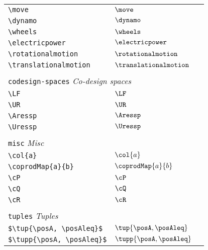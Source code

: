 \begin{longtable}{lll}
 {\color[rgb]{0.5,0.5,0.5}\texttt{\textbackslash move}} & $\move$ & \\ 
 {\color[rgb]{0.5,0.5,0.5}\texttt{\textbackslash dynamo}} & $\dynamo$ & \\ 
 {\color[rgb]{0.5,0.5,0.5}\texttt{\textbackslash wheels}} & $\wheels$ & \\ 
 {\color[rgb]{0.5,0.5,0.5}\texttt{\textbackslash electricpower}} & $\electricpower$ & \\ 
 {\color[rgb]{0.5,0.5,0.5}\texttt{\textbackslash rotationalmotion}} & $\rotationalmotion$ & \\ 
 {\color[rgb]{0.5,0.5,0.5}\texttt{\textbackslash translationalmotion}} & $\translationalmotion$ & \\ 
  &  & \\ 
 \multicolumn{3}{l}{{\color[rgb]{0.5,0.5,0.5}\texttt{codesign-spaces}} \emph{Co-design spaces}}\\ 
 \hline
\hline
{\color[rgb]{0.5,0.5,0.5}\texttt{\textbackslash LF}} & $\LF$ & \\ 
 {\color[rgb]{0.5,0.5,0.5}\texttt{\textbackslash UR}} & $\UR$ & \\ 
 {\color[rgb]{0.5,0.5,0.5}\texttt{\textbackslash Aressp}} & $\Aressp$ & \\ 
 {\color[rgb]{0.5,0.5,0.5}\texttt{\textbackslash Uressp}} & $\Uressp$ & \\ 
  &  & \\ 
 \multicolumn{3}{l}{{\color[rgb]{0.5,0.5,0.5}\texttt{misc}} \emph{Misc}}\\ 
 \hline
\hline
{\color[rgb]{0.5,0.5,0.5}\texttt{\textbackslash col\{a\}}} & $\col{a}$ & \\ 
 {\color[rgb]{0.5,0.5,0.5}\texttt{\textbackslash coprodMap\{a\}\{b\}}} & $\coprodMap{a}{b}$ & \\ 
 {\color[rgb]{0.5,0.5,0.5}\texttt{\textbackslash cP}} & $\cP$ & \\ 
 {\color[rgb]{0.5,0.5,0.5}\texttt{\textbackslash cQ}} & $\cQ$ & \\ 
 {\color[rgb]{0.5,0.5,0.5}\texttt{\textbackslash cR}} & $\cR$ & \\ 
  &  & \\ 
 \multicolumn{3}{l}{{\color[rgb]{0.5,0.5,0.5}\texttt{tuples}} \emph{Tuples}}\\ 
 \hline
\hline
{\color[rgb]{0.5,0.5,0.5}\texttt{\$\textbackslash tup\{\textbackslash posA, \textbackslash posAleq\}\$}} & $\tup{\posA, \posAleq}$ & \\ 
 {\color[rgb]{0.5,0.5,0.5}\texttt{\$\textbackslash tupp\{\textbackslash posA, \textbackslash posAleq\}\$}} & $\tupp{\posA, \posAleq}$ & \\ 

\end{longtable}
